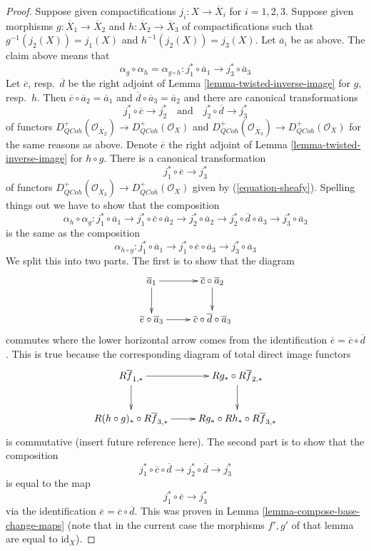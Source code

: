 \documentclass{stacks-project}
\theoremstyle{plain}
\theoremstyle{definition}
\theoremstyle{remark}
\numberwithin{equation}{subsection}
\def\QCoh{\mathit{QCoh}}
\begin{document}
\begin{proof}
\medskip\noindent
Suppose given compactifications $j_i : X \to \overline{X}_i$
for $i = 1, 2, 3$.  Suppose given morphisms
$g : \overline{X}_1 \to \overline{X}_2$ and
$h : \overline{X}_2 \to \overline{X}_3$ of compactifications
such that $g^{-1}(j_2(X)) = j_1(X)$ and $h^{-1}(j_2(X)) = j_3(X)$.
Let $\overline{a}_i$ be as above. The claim above means that
$$
\alpha_g \circ \alpha_h = \alpha_{g \circ h} :
j_1^* \circ \overline{a}_1 \to j_3^* \circ \overline{a}_3
$$
Let $\overline{c}$, resp.\ $\overline{d}$ be the right adjoint of
Lemma \ref{lemma-twisted-inverse-image} for $g$, resp.\ $h$.
Then $\overline{c} \circ \overline{a}_2 = \overline{a}_1$ and
$\overline{d} \circ \overline{a}_3 = \overline{a}_2$
and there are canonical transformations
$$
j_1^* \circ \overline{c} \longrightarrow j_2^*
\quad\text{and}\quad
j_2^* \circ \overline{d} \longrightarrow j_3^*
$$
of functors
$D^+_\QCoh(\mathcal{O}_{\overline{X}_2}) \to D^+_\QCoh(\mathcal{O}_X)$
and
$D^+_\QCoh(\mathcal{O}_{\overline{X}_3}) \to D^+_\QCoh(\mathcal{O}_X)$
for the same reasons as above. Denote $\overline{e}$ the
right adjoint of Lemma \ref{lemma-twisted-inverse-image}
for $h \circ g$. There is a canonical transformation
$$
j_1^* \circ \overline{e} \longrightarrow j_3^*
$$
of functors
$D^+_\QCoh(\mathcal{O}_{\overline{X}_3}) \to D^+_\QCoh(\mathcal{O}_X)$
given by (\ref{equation-sheafy}). Spelling things out we have to
show that the composition
$$
\alpha_h \circ \alpha_g :
j_1^* \circ \overline{a}_1 \to
j_1^* \circ \overline{c} \circ \overline{a}_2 \to
j_2^* \circ \overline{a}_2 \to
j_2^* \circ \overline{d} \circ \overline{a}_3 \to
j_3^* \circ \overline{a}_3
$$
is the same as the composition
$$
\alpha_{h \circ g} :
j_1^* \circ \overline{a}_1 \to
j_1^* \circ \overline{e} \circ \overline{a}_3 \to
j_3^* \circ \overline{a}_3
$$
We split this into two parts. The first is to show that the diagram
$$
\xymatrix{
\overline{a}_1 \ar[r] \ar[d] & \overline{c} \circ \overline{a}_2 \ar[d] \\
\overline{e} \circ \overline{a}_3 \ar[r] &
\overline{c} \circ \overline{d} \circ \overline{a}_3
}
$$
commutes where the lower horizontal arrow comes from the identification
$\overline{e} = \overline{c} \circ \overline{d}$. This is true
because the corresponding diagram of total direct image functors
$$
\xymatrix{
R\overline{f}_{1, *} \ar[r] \ar[d] & Rg_* \circ R\overline{f}_{2, *} \ar[d] \\
R(h \circ g)_* \circ R\overline{f}_{3, *} \ar[r] &
Rg_* \circ Rh_* \circ R\overline{f}_{3, *}
}
$$
is commutative (insert future reference here). The second part
is to show that the composition
$$
j_1^* \circ \overline{c} \circ \overline{d} \to
j_2^* \circ \overline{d} \to j_3^*
$$
is equal to the map
$$
j_1^* \circ \overline{e} \to j_3^*
$$
via the identification $\overline{e} = \overline{c} \circ \overline{d}$.
This was proven in Lemma \ref{lemma-compose-base-change-maps}
(note that in the current case the morphisms $f', g'$ of that
lemma are equal to $\text{id}_X$).
\end{proof}
\end{document}
